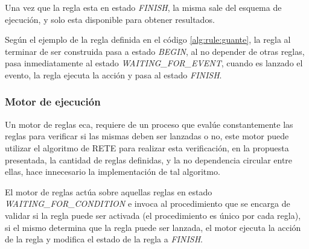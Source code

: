 Una vez que la regla esta en estado \emph{FINISH}, la misma sale del esquema de
ejecución, y solo esta disponible para obtener resultados.

Según el ejemplo de la regla definida en el código \ref{alg:rule:guante}, la
regla al terminar de ser construida pasa a estado \emph{BEGIN}, al no depender
de otras reglas, pasa inmediatamente al estado \emph{WAITING\_FOR\_EVENT},
cuando es lanzado el evento, la regla ejecuta la acción y pasa al estado
\emph{FINISH}.

\subsubsection{Motor de ejecución}

Un motor de reglas \gls{eca}, requiere de un proceso que evalúe constantemente
las reglas para verificar si las mismas deben ser lanzadas o
no\cite{bailey2004event}\cite{galton2002two}, este motor puede utilizar el
algoritmo de RETE\cite{de2001eca} para realizar esta verificación, en la
propuesta presentada, la cantidad de reglas definidas, y la no dependencia
circular entre ellas, hace innecesario la implementación de tal
algoritmo\cite{de2001eca}. 

El motor de reglas actúa sobre aquellas reglas en estado
\emph{WAITING\_FOR\_CONDITION} e invoca al procedimiento que se encarga de
validar si la regla puede ser activada (el procedimiento es único por cada
regla), si el mismo determina que la regla puede ser lanzada, el motor ejecuta
la acción de la regla y modifica el estado de la regla a \emph{FINISH}.
